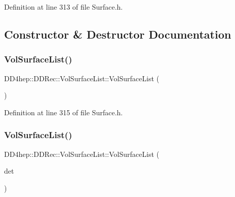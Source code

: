 Definition at line 313 of file Surface.\+h.



\subsection{Constructor \& Destructor Documentation}
\hypertarget{struct_d_d4hep_1_1_d_d_rec_1_1_vol_surface_list_a507b0bd784bd76bd7db0f321cbeb32cc}{}\label{struct_d_d4hep_1_1_d_d_rec_1_1_vol_surface_list_a507b0bd784bd76bd7db0f321cbeb32cc} 
\subsubsection{\texorpdfstring{Vol\+Surface\+List()}{VolSurfaceList()}\hspace{0.1cm}{\footnotesize\ttfamily [1/3]}}
{\footnotesize\ttfamily D\+D4hep\+::\+D\+D\+Rec\+::\+Vol\+Surface\+List\+::\+Vol\+Surface\+List (\begin{DoxyParamCaption}{ }\end{DoxyParamCaption})\hspace{0.3cm}{\ttfamily [inline]}}



Definition at line 315 of file Surface.\+h.

\hypertarget{struct_d_d4hep_1_1_d_d_rec_1_1_vol_surface_list_a0a770b1964232e22b98bb900bdb785f5}{}\label{struct_d_d4hep_1_1_d_d_rec_1_1_vol_surface_list_a0a770b1964232e22b98bb900bdb785f5} 
\subsubsection{\texorpdfstring{Vol\+Surface\+List()}{VolSurfaceList()}\hspace{0.1cm}{\footnotesize\ttfamily [2/3]}}
{\footnotesize\ttfamily D\+D4hep\+::\+D\+D\+Rec\+::\+Vol\+Surface\+List\+::\+Vol\+Surface\+List (\begin{DoxyParamCaption}\item[{\hyperlink{class_d_d4hep_1_1_geometry_1_1_det_element}{Geometry\+::\+Det\+Element} \&}]{det }\end{DoxyParamCaption})\hspace{0.3cm}{\ttfamily [inline]}}



